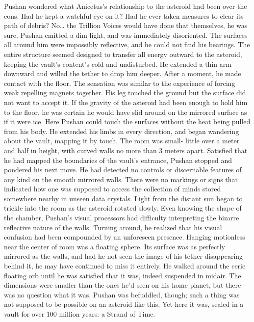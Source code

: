\documentclass[a4paper]{article}
\begin{document}
Pushan wondered what Anicetus’s relationship to the asteroid had been over the eons. Had he kept a watchful eye on it? Had he ever taken measures to clear its path of debris? No… the Trillion Voices would have done that themselves, he was sure.
Pushan emitted a dim light, and was immediately disoriented. The surfaces all around him were impossibly reflective, and he could not find his bearings. The entire structure seemed designed to transfer all energy outward to the asteroid, keeping the vault’s content’s cold and undisturbed.
He extended a thin arm downward and willed the tether to drop him deeper. After a moment, he made contact with the floor. The sensation was similar to the experience of forcing weak repelling magnets together. His leg touched the ground but the surface did not want to accept it. If the gravity of the asteroid had been enough to hold him to the floor, he was certain he would have slid around on the mirrored surface as if it were ice.
Here Pushan could touch the surfaces without the heat being pulled from his body. He extended his limbs in every direction, and began wandering about the vault, mapping it by touch. The room was small- little over a meter and half in height, with curved walls no more than 3 meters apart.
Satisfied that he had mapped the boundaries of the vault’s entrance, Pushan stopped and pondered his next move. He had detected no controls or discernable features of any kind on the smooth mirrored walls. There were no markings or signs that indicated how one was supposed to access the collection of minds stored somewhere nearby in unseen data crystals.
Light from the distant sun began to trickle into the room as the asteroid rotated slowly. Even knowing the shape of the chamber, Pushan’s visual processors had difficulty interpreting the bizarre reflective nature of the walls. Turning around, he realized that his visual confusion had been compounded by an unforeseen presence. Hanging motionless near the center of room was a floating sphere. Its surface was as perfectly mirrored as the walls, and had he not seen the image of his tether disappearing behind it, he may have continued to miss it entirely.
He walked around the eerie floating orb until he was satisfied that it was, indeed suspended in midair. The dimensions were smaller than the ones he’d seen on his home planet, but there was no question what it was. Pushan was befuddled, though; such a thing was not supposed to be possible on an asteroid like this. Yet here it was, sealed in a vault for over 100 million years: a Strand of Time.
\end{document}
